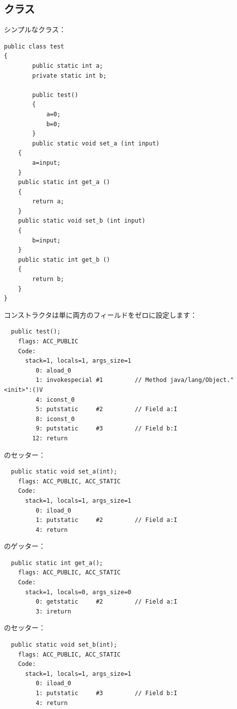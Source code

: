 \subsection{クラス}

シンプルなクラス：

\begin{lstlisting}[caption=test.java,style=customjava]
public class test
{
        public static int a;
        private static int b;

        public test()
        {
            a=0;
            b=0;
        }
        public static void set_a (int input)
	{
		a=input;
	}
	public static int get_a ()
	{
		return a;
	}
	public static void set_b (int input)
	{
		b=input;
	}
	public static int get_b ()
	{
		return b;
	}
}
\end{lstlisting}

コンストラクタは単に両方のフィールドをゼロに設定します：


\begin{lstlisting}
  public test();
    flags: ACC_PUBLIC
    Code:
      stack=1, locals=1, args_size=1
         0: aload_0       
         1: invokespecial #1         // Method java/lang/Object."<init>":()V
         4: iconst_0      
         5: putstatic     #2         // Field a:I
         8: iconst_0      
         9: putstatic     #3         // Field b:I
        12: return        
\end{lstlisting}
        
のセッター：

\begin{lstlisting}
  public static void set_a(int);
    flags: ACC_PUBLIC, ACC_STATIC
    Code:
      stack=1, locals=1, args_size=1
         0: iload_0       
         1: putstatic     #2         // Field a:I
         4: return        
\end{lstlisting}

のゲッター：

\begin{lstlisting}
  public static int get_a();
    flags: ACC_PUBLIC, ACC_STATIC
    Code:
      stack=1, locals=0, args_size=0
         0: getstatic     #2         // Field a:I
         3: ireturn       
\end{lstlisting}

のセッター：

\begin{lstlisting}
  public static void set_b(int);
    flags: ACC_PUBLIC, ACC_STATIC
    Code:
      stack=1, locals=1, args_size=1
         0: iload_0       
         1: putstatic     #3         // Field b:I
         4: return        
\end{lstlisting}

